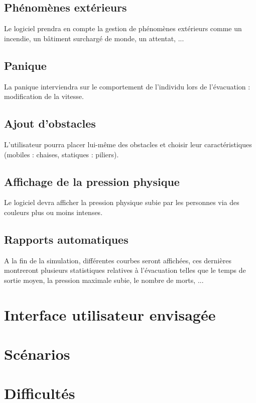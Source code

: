 \documentclass{article}
\begin{document}
    \subsection{Phénomènes extérieurs}
    Le logiciel prendra en compte la gestion de phénomènes extérieurs comme un incendie, un bâtiment surchargé de monde, un attentat, ...
        
    \subsection{Panique}
    La panique interviendra sur le comportement de l'individu lors de l'évacuation : modification de la vitesse. 

    \subsection{Ajout d'obstacles}
    L'utilisateur pourra placer lui-même des obstacles et choisir leur caractéristiques (mobiles : chaises, statiques : piliers).

    \subsection{Affichage de la pression physique}
    Le logiciel devra afficher la pression physique subie par les personnes via des couleurs plus ou moins intenses.
    
    \subsection{Rapports automatiques}
    A la fin de la simulation, différentes courbes seront affichées, ces dernières montreront plusieurs statistiques relatives à l'évacuation telles que le temps de sortie moyen, la pression maximale subie, le nombre de morts, ... 
    
\section{Interface utilisateur envisagée}

\section{Scénarios}

\section{Difficultés}
\end{document}
